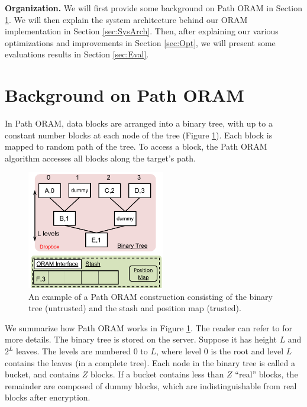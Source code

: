 \documentclass[conference]{IEEEtran}
\begin{document}
\textbf{Organization.} 
We will first provide some background on Path ORAM in Section \ref{sec:Background}. We will then explain the system architecture behind our ORAM implementation in Section \ref{sec:SysArch}. Then, after explaining our various optimizations and improvements in Section \ref{sec:Opt}, we will present some evaluations results in Section \ref{sec:Eval}.


\section{Background on Path ORAM}

\label{sec:Background}
In Path ORAM, data blocks are arranged into a binary tree, with up to a constant number blocks at each node of the tree (Figure \ref{fig:bintree}). 
Each block is mapped to random path of the tree.
To access a block, the Path ORAM algorithm accesses all blocks along the target’s path. 

\begin{figure}
\begin{center}
  \includegraphics[width=6cm]{220.pdf}
  \caption{An example of a Path ORAM construction consisting of the binary tree (untrusted) and the stash and position map (trusted).}
  \label{fig:bintree}
\end{center}
\end{figure}

We summarize how Path ORAM works in Figure \ref{fig:bintree}. The reader can refer to \cite{PathORAM} for more details. The binary tree is stored on the server. 
Suppose it has height $L$ and $2^L$ leaves. 
The levels are numbered 0 to $L$, where level 0 is the root and level $L$ contains the leaves (in a complete tree). 
Each node in the binary tree is called a bucket, and contains $Z$ blocks. 
If a bucket contains less than $Z$ “real” blocks, the remainder are composed of dummy blocks, which are indistinguishable from real blocks after encryption.
\end{document}
